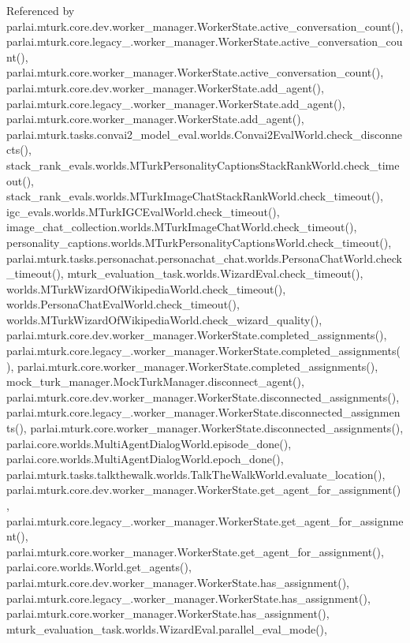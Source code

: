 Referenced by parlai.\+mturk.\+core.\+dev.\+worker\+\_\+manager.\+Worker\+State.\+active\+\_\+conversation\+\_\+count(), parlai.\+mturk.\+core.\+legacy\+\_.\+worker\+\_\+manager.\+Worker\+State.\+active\+\_\+conversation\+\_\+count(), parlai.\+mturk.\+core.\+worker\+\_\+manager.\+Worker\+State.\+active\+\_\+conversation\+\_\+count(), parlai.\+mturk.\+core.\+dev.\+worker\+\_\+manager.\+Worker\+State.\+add\+\_\+agent(), parlai.\+mturk.\+core.\+legacy\+\_.\+worker\+\_\+manager.\+Worker\+State.\+add\+\_\+agent(), parlai.\+mturk.\+core.\+worker\+\_\+manager.\+Worker\+State.\+add\+\_\+agent(), parlai.\+mturk.\+tasks.\+convai2\+\_\+model\+\_\+eval.\+worlds.\+Convai2\+Eval\+World.\+check\+\_\+disconnects(), stack\+\_\+rank\+\_\+evals.\+worlds.\+M\+Turk\+Personality\+Captions\+Stack\+Rank\+World.\+check\+\_\+timeout(), stack\+\_\+rank\+\_\+evals.\+worlds.\+M\+Turk\+Image\+Chat\+Stack\+Rank\+World.\+check\+\_\+timeout(), igc\+\_\+evals.\+worlds.\+M\+Turk\+I\+G\+C\+Eval\+World.\+check\+\_\+timeout(), image\+\_\+chat\+\_\+collection.\+worlds.\+M\+Turk\+Image\+Chat\+World.\+check\+\_\+timeout(), personality\+\_\+captions.\+worlds.\+M\+Turk\+Personality\+Captions\+World.\+check\+\_\+timeout(), parlai.\+mturk.\+tasks.\+personachat.\+personachat\+\_\+chat.\+worlds.\+Persona\+Chat\+World.\+check\+\_\+timeout(), mturk\+\_\+evaluation\+\_\+task.\+worlds.\+Wizard\+Eval.\+check\+\_\+timeout(), worlds.\+M\+Turk\+Wizard\+Of\+Wikipedia\+World.\+check\+\_\+timeout(), worlds.\+Persona\+Chat\+Eval\+World.\+check\+\_\+timeout(), worlds.\+M\+Turk\+Wizard\+Of\+Wikipedia\+World.\+check\+\_\+wizard\+\_\+quality(), parlai.\+mturk.\+core.\+dev.\+worker\+\_\+manager.\+Worker\+State.\+completed\+\_\+assignments(), parlai.\+mturk.\+core.\+legacy\+\_.\+worker\+\_\+manager.\+Worker\+State.\+completed\+\_\+assignments(), parlai.\+mturk.\+core.\+worker\+\_\+manager.\+Worker\+State.\+completed\+\_\+assignments(), mock\+\_\+turk\+\_\+manager.\+Mock\+Turk\+Manager.\+disconnect\+\_\+agent(), parlai.\+mturk.\+core.\+dev.\+worker\+\_\+manager.\+Worker\+State.\+disconnected\+\_\+assignments(), parlai.\+mturk.\+core.\+legacy\+\_.\+worker\+\_\+manager.\+Worker\+State.\+disconnected\+\_\+assignments(), parlai.\+mturk.\+core.\+worker\+\_\+manager.\+Worker\+State.\+disconnected\+\_\+assignments(), parlai.\+core.\+worlds.\+Multi\+Agent\+Dialog\+World.\+episode\+\_\+done(), parlai.\+core.\+worlds.\+Multi\+Agent\+Dialog\+World.\+epoch\+\_\+done(), parlai.\+mturk.\+tasks.\+talkthewalk.\+worlds.\+Talk\+The\+Walk\+World.\+evaluate\+\_\+location(), parlai.\+mturk.\+core.\+dev.\+worker\+\_\+manager.\+Worker\+State.\+get\+\_\+agent\+\_\+for\+\_\+assignment(), parlai.\+mturk.\+core.\+legacy\+\_.\+worker\+\_\+manager.\+Worker\+State.\+get\+\_\+agent\+\_\+for\+\_\+assignment(), parlai.\+mturk.\+core.\+worker\+\_\+manager.\+Worker\+State.\+get\+\_\+agent\+\_\+for\+\_\+assignment(), parlai.\+core.\+worlds.\+World.\+get\+\_\+agents(), parlai.\+mturk.\+core.\+dev.\+worker\+\_\+manager.\+Worker\+State.\+has\+\_\+assignment(), parlai.\+mturk.\+core.\+legacy\+\_.\+worker\+\_\+manager.\+Worker\+State.\+has\+\_\+assignment(), parlai.\+mturk.\+core.\+worker\+\_\+manager.\+Worker\+State.\+has\+\_\+assignment(), mturk\+\_\+evaluation\+\_\+task.\+worlds.\+Wizard\+Eval.\+parallel\+\_\+eval\+\_\+mode(), 